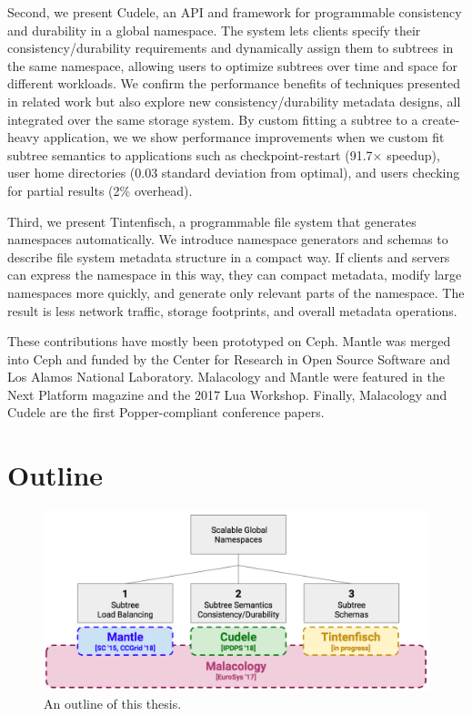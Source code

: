 Second, we present Cudele, an API and framework for programmable consistency
and durability in a global namespace. The system lets clients specify their
consistency/durability requirements and dynamically assign them to subtrees in
the same namespace, allowing users to optimize subtrees over time and space for
different workloads. We confirm the performance benefits of techniques
presented in related work but also explore new consistency/durability metadata
designs, all integrated over the same storage system. By custom fitting a
subtree to a create-heavy application, we we show performance improvements when
we custom fit subtree semantics to applications such as checkpoint-restart
(91.7\(\times\) speedup), user home directories (0.03 standard deviation from
optimal), and users checking for partial results (2\% overhead).

Third, we present Tintenfisch, a programmable file system that generates
namespaces automatically. We introduce namespace generators and schemas to
describe file system metadata structure in a compact way. If clients and
servers can express the namespace in this way, they can compact metadata,
modify large namespaces more quickly, and generate only relevant parts of the
namespace. The result is less network traffic, storage footprints, and overall
metadata operations.

These contributions have mostly been prototyped on Ceph. Mantle was merged into
Ceph and funded by the Center for Research in Open Source Software and Los
Alamos National Laboratory. Malacology and Mantle were featured in the Next
Platform magazine and the 2017 Lua Workshop. Finally, Malacology and Cudele are
the first Popper-compliant conference papers.

\section{Outline}

\begin{figure}[tb]
  \centering
  \includegraphics[width=1\textwidth]{./chapters/overview.png}
  \caption{An outline of this thesis.}
  \label{fig:thesis-overview}
\end{figure}

